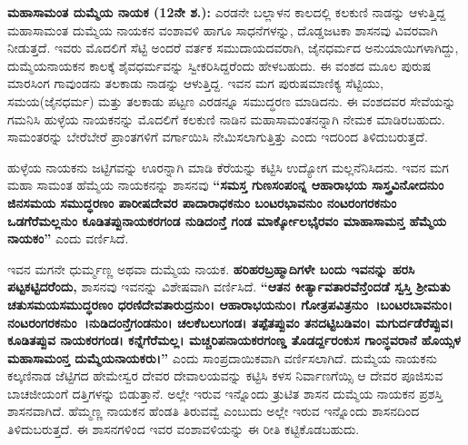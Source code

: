 \textbf{ಮಹಾಸಾಮಂತ ದುಮ್ಮೆಯ ನಾಯಕ (12ನೇ ಶ.):} ಎರಡನೇ ಬಲ್ಲಾಳನ ಕಾಲದಲ್ಲಿ ಕಲಕುಣಿ ನಾಡನ್ನು ಆಳುತ್ತಿದ್ದ ಮಹಾಸಾಮಂತ ದುಮ್ಮೆಯ ನಾಯಕನ ವಂಶಾವಳಿ ಹಾಗೂ ಸಾಧನೆಗಳನ್ನು, ದೊಡ್ಡಜಟಕಾ ಶಾಸನವು ವಿವರವಾಗಿ ನೀಡುತ್ತದೆ. ಇವರು ಮೊದಲಿಗೆ ಸೆಟ್ಟಿ ಅಂದರೆ ವರ್ತಕ ಸಮುದಾಯದವರಾಗಿ, ಜೈನಧರ್ಮದ ಅನುಯಾಯಿಗಳಾಗಿದ್ದು, ದುಮ್ಮೆಯ\-ನಾಯಕನ ಕಾಲಕ್ಕೆ ಶೈವಧರ್ಮವನ್ನು ಸ್ವೀಕರಿಸಿದ್ದರೆಂದು ಹೇಳಬಹುದು. ಈ ವಂಶದ ಮೂಲ ಪುರುಷ ಮಾರಸಿಂಗ ಗಾವುಂಡನು ತಲಕಾಡು ನಾಡನ್ನು ಆಳುತ್ತಿದ್ದ. ಇವನ ಮಗ ಪುರುಷಮಾಣಿಕ್ಯ ಸೆಟ್ಟಿಯು, ಸಮಯ(ಜೈನಧರ್ಮ) ಮತ್ತು ತಲಕಾಡು ಪಟ್ಟಣ ಎರಡನ್ನೂ ಸಮುದ್ಧರಣ ಮಾಡಿದನು. ಈ ವಂಶದವರ ಸೇವೆಯನ್ನು ಗಮನಿಸಿ ಹುಳ್ಳೆಯ ನಾಯಕನನ್ನು ಮೊದಲಿಗೆ ಕಲಕುಣಿ ನಾಡಿನ ಮಹಾಸಾಮಂತನನ್ನಾಗಿ ನೇಮಕ ಮಾಡಿರಬಹುದು. ಸಾಮಂತರನ್ನು ಬೇರೆಬೇರೆ ಪ್ರಾಂತಗಳಿಗೆ ವರ್ಗಾಯಿಸಿ ನೇಮಿಸಲಾಗುತ್ತಿತ್ತು ಎಂದು ಇದರಿಂದ ತಿಳಿದುಬರುತ್ತದೆ.

ಹುಳ್ಳೆಯ ನಾಯಕನು ಜಟ್ಟಿಗವನ್ನು ಊರನ್ನಾಗಿ ಮಾಡಿ ಕೆರೆಯನ್ನು ಕಟ್ಟಿಸಿ ಉದ್ಯೋಗ ಮಲ್ಲನೆನಿಸಿದನು. ಇವನ ಮಗ ಮಹಾ ಸಾಮಂತ ಹೆಮ್ಮೆಯ ನಾಯಕನನ್ನು ಶಾಸನವು \textbf{“ಸಮಸ್ತ ಗುಣಸಂಪಂನ್ನ ಆಹಾರಾಭಯ ಸಾಸ್ತ್ರವಿನೋದನುಂ ಜಿನಸಮಯ ಸಮುದ್ಧರಣಂ ಪಾರೀಷದೇವರ ಪಾದಾರಾಧಕನುಂ ಬಂಟರಭಾವನುಂ ನಂಟರಂಗರಕನುಂ ಒಡಗೆರೆಮಲ್ಲನುಂ ಕೂಡಿತಪ್ಪುನಾಯಕರಗಂಡ ನುಡಿದಂನ್ತೆ ಗಂಡ ಮಾರ್ಕ್ಕೋಲಭೈರವಂ ಮಾಹಾಸಾಮನ್ತ ಹೆಮ್ಮೆಯ ನಾಯಕಂ”} ಎಂದು ವರ್ಣಿಸಿದೆ.

ಇವನ ಮಗನೇ ಧುರ್ಮ್ಮಣ್ಣ ಅಥವಾ ದುಮ್ಮೆಯ ನಾಯಕ. \textbf{ಹರಿಹರಬ್ರಹ್ಮಾದಿಗಳೇ ಬಂದು ಇವನನ್ನು ಹರಸಿ ಪಟ್ಟಕಟ್ಟಿದ\-ರೆಂದು,} ಶಾಸನವು ಇವನನ್ನು ವಿಶೇಷವಾಗಿ ವರ್ಣಿಸಿದೆ.\textbf{ “ಆತನ ಕೀರ್ತ್ಯಾವತಾರವೆನ್ತೆಂದಡೆ ಸ್ವಸ್ತಿ ಶ‍್ರೀಮತು\general{\break } ಚತುಸಮಯಸಮುದ್ಧರಣಂ ಧರಣಿದೇವತಾರುದ್ರನುಂ। ಆಹಾರಾಭಯನುಂ। ಗೋತ್ರಪವಿತ್ರನುಂ~।ಬಂಟರಬಾವನುಂ।\general{\break } ನಂಟರಂಗರಕನುಂ~।ನುಡಿದಂನ್ತೆಗಂಡನುಂ। ಚಲಕೆಬಲುಗಂಡ। ತಪ್ಪೆತಪ್ಪುವಂ ತನದಟ್ಟಿಬಡಿವಂ। ಮಗುರ್ದಡೆರೆಪ್ಪುವ। ಕೂಡಿತಪ್ಪುವ ನಾಯಕರಗಂಡ। ಕನ್ನೆಗೆರೆಮಲ್ಲ। ಮಚ್ಚರಿಪನಾಯಕರಗಂಣ್ಡ ತೊಡರ್ದ್ದರಂಕುಸ ಗಾಂನ್ಧವರಾನೆ ಹೊಯ್ಸಳ ಮಹಾಸಾಮಂನ್ತ\general{\break } ದುಮ್ಮೆಯನಾಯಕರು।”} ಎಂದು ಸಾಂಪ್ರದಾಯಿಕವಾಗಿ ವರ್ಣಿಸಲಾಗಿದೆ. ದುಮ್ಮೆಯ ನಾಯಕನು ಕಲ್ಕಣಿನಾಡ ಜೆಟ್ಟಿಗದ ಹೇಮೇಸ್ವರ ದೇವರ ದೇವಾಲಯವನ್ನು ಕಟ್ಟಿಸಿ ಕಳಸ ನಿರ್ವಾಣಗೆಯ್ಸಿ ಆ ದೇವರ ಪೂಜಿಸುವ ಬಾಚಜೀಯಂಗೆ ದತ್ತಿಗಳನ್ನು ಬಿಡುತ್ತಾನೆ. ಅಲ್ಲೇ ಇರುವ ಇನ್ನೊಂದು ತ್ರುಟಿತ ಶಾಸನ ದುಮ್ಮೆಯ ನಾಯಕನ ಪ್ರಶಸ್ತಿ ಶಾಸನವಾಗಿದೆ. ಹೆಮ್ಮಣ್ಣ ನಾಯಕನ ಹೆಂಡತಿ ತಿರುವವ್ವೆ ಎಂಬುದು ಅಲ್ಲೇ ಇರುವ ಇನ್ನೊಂದು ಶಾಸನದಿಂದ ತಿಳಿದುಬರುತ್ತದೆ. ಈ ಶಾಸನಗಳಿಂದ ಇವರ ವಂಶಾವಳಿಯನ್ನು ಈ ರೀತಿ ಕಟ್ಟಿಕೊಡಬಹುದು.

